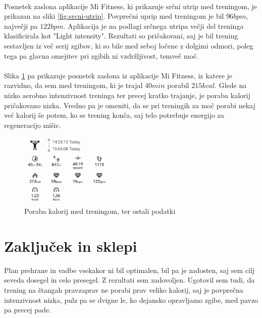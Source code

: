 \documentclass{article}
\begin{document}
\paragraph{}
Posnetek zaslona aplikacije Mi Fitness, ki prikazuje srčni utrip med treningom, je prikazan na sliki \ref{fig:srcni-utrip}. Povprečni uprip med treningom je bil $96bpm$, največji pa $122bpm$. Aplikacija je na podlagi srčnega utripa večji del treninga klasificirala kot "Light intensity". Rezultati so pričakovani, saj je bil trening sestavljen iz več serij zgibov, ki so bile med seboj ločene z dolgimi odmori, poleg tega pa glavna omejitev pri zgibih ni vzdržljivost, temveč moč. 

\paragraph{}
Slika \ref{fig:poraba-kalorij} pa prikazuje posnetek zaslona iz aplikacije Mi Fitness, iz katere je razvidno, da sem med treningom, ki je trajal $40 min$ porabil $215 kcal$. Glede na nizko aerobno intenzivnost treninga ter precej kratko trajanje, je poraba kalorij pričakovano nizka. Vredno pa je omeniti, da se pri treningih za moč porabi nekaj več kalorij še potem, ko se trening konča, saj telo potrebuje energijo za regeneracijo mišic.

\begin{figure}[H]
    \centering
    \includegraphics[width=0.4\textwidth]{figures/poraba-kalorij.jpg}
    \caption{Poraba kalorij med treningom, ter ostali podatki} 
    \label{fig:poraba-kalorij}
\end{figure}

\section{Zaključek in sklepi}

Plan prehrane in vadbe vsekakor ni bil optimalen, bil pa je zadosten, saj sem cilj seveda dosegel in celo presegel. Z rezultati sem zadovoljen. Ugotovil sem tudi, da trening na štangah pravzaprav ne porabi prav veliko kalorij, saj je povprečna intenzivnost nizka, pulz pa se dvigne le, ko dejansko opravljamo zgibe, med pavzo pa precej pade. 
\end{document}
